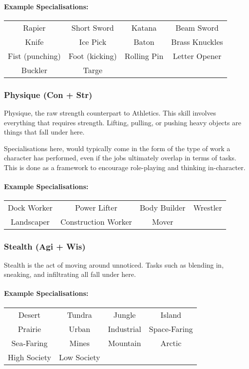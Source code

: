 \paragraph{Example Specialisations:}
\begin{center}
    \begin{tabular}{c|c|c|c}
        Rapier & Short Sword & Katana & Beam Sword \\
        Knife & Ice Pick & Baton & Brass Knuckles \\
        Fist (punching) & Foot (kicking) & Rolling Pin & Letter Opener \\
        Buckler & Targe\\
    \end{tabular}
\end{center}

\subsubsection{Physique (Con + Str)}
Physique, the raw strength counterpart to Athletics. 
This skill involves everything that requires strength.
Lifting, pulling, or pushing heavy objects are things that fall under here.

Specialisations here, would typically come in the form of the type of work a character has performed, even if the jobs ultimately overlap in terms of tasks.
This is done as a framework to encourage role-playing and thinking in-character.

\paragraph{Example Specialisations:}
\begin{center}
    \begin{tabular}{c|c|c|c}
        Dock Worker & Power Lifter & Body Builder & Wrestler \\
        Landscaper & Construction Worker & Mover
    \end{tabular}
\end{center}

\subsubsection{Stealth (Agi + Wis)}
Stealth is the act of moving around unnoticed.
Tasks such as blending in, sneaking, and infiltrating all fall under here.

\paragraph{Example Specialisations:}
\begin{center}
    \begin{tabular}{c|c|c|c}
        Desert & Tundra & Jungle & Island \\
        Prairie & Urban & Industrial & Space-Faring \\
        Sea-Faring & Mines & Mountain & Arctic \\
        High Society & Low Society \\
    \end{tabular}
\end{center}

